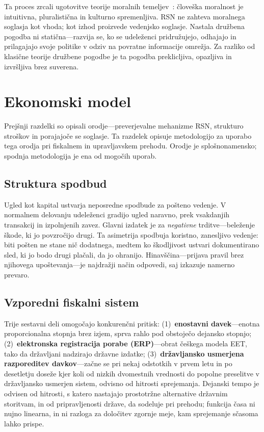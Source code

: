 \documentclass[11pt,a4paper,twocolumn]{article}
\begin{document}
Ta proces zrcali ugotovitve teorije moralnih temeljev~\cite{haidt2012}: človeška moralnost je intuitivna, pluralistična in kulturno spremenljiva. RSN ne zahteva moralnega soglasja kot vhoda; kot izhod proizvede vedenjsko soglasje. Nastala družbena pogodba ni statična---razvija se, ko se udeleženci pridružujejo, odhajajo in prilagajajo svoje politike v odziv na povratne informacije omrežja. Za razliko od klasične teorije družbene pogodbe je ta pogodba preklicljiva, opazljiva in izvršljiva brez suverena.

\section{Ekonomski model}

Prejšnji razdelki so opisali orodje---preverjevalne mehanizme RSN, strukturo stroškov in porajajoče se soglasje. Ta razdelek opisuje metodologijo za uporabo tega orodja pri fiskalnem in upravljavskem prehodu. Orodje je splošnonamensko; spodnja metodologija je ena od mogočih uporab.

\subsection{Struktura spodbud}

Ugled kot kapital ustvarja neposredne spodbude za pošteno vedenje. V normalnem delovanju udeleženci gradijo ugled naravno, prek vsakdanjih transakcij in izpolnjenih zavez. Glavni izdatek je za \emph{negativne} trditve---beleženje škode, ki jo povzročijo drugi. Ta asimetrija spodbuja koristno, zanesljivo vedenje: biti pošten ne stane nič dodatnega, medtem ko škodljivost ustvari dokumentirano sled, ki jo bodo drugi plačali, da jo ohranijo. Hinavščina---prijava pravil brez njihovega upoštevanja---je najdražji način odpovedi, saj izkazuje namerno prevaro.

\subsection{Vzporedni fiskalni sistem}

Trije sestavni deli omogočajo konkurenčni pritisk: (1)~\textbf{enostavni davek}---enotna proporcionalna stopnja brez izjem, sprva rahlo pod obstoječo dejansko stopnjo; (2)~\textbf{elektronska registracija porabe (ERP)}---obrat češkega modela EET, tako da državljani nadzirajo državne izdatke; (3)~\textbf{državljansko usmerjena razporeditev davkov}---začne se pri nekaj odstotkih v prvem letu in po desetletju doseže kjer koli od nizkih dvomestnih vrednosti do popolne preselitve v državljansko usmerjen sistem, odvisno od hitrosti sprejemanja. Dejanski tempo je odvisen od hitrosti, s katero nastajajo prostotržne alternative državnim storitvam, in od pripravljenosti države, da sodeluje pri prehodu; funkcija časa ni nujno linearna, in ni razloga za določitev zgornje meje, kam sprejemanje sčasoma lahko prispe.
\end{document}
